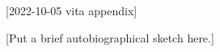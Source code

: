 [2022-10-05 vita appendix]

\begin{vita}
\index{\verb+\begin{vita}+}
  
[Put a brief autobiographical sketch here.]

\end{vita}
